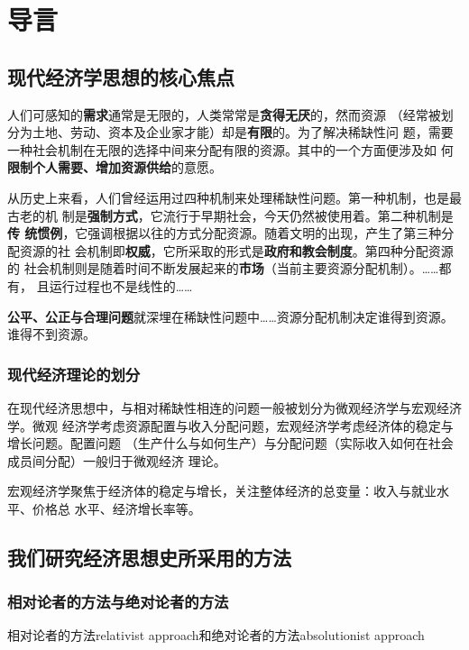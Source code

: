 \chapter{导言}

\section{现代经济学思想的核心焦点}

人们可感知的\textbf{需求}通常是无限的，人类常常是\textbf{贪得无厌}的，然而资源
（经常被划分为土地、劳动、资本及企业家才能）却是\textbf{有限}的。为了解决稀缺性问
题，需要一种社会机制在无限的选择中间来分配有限的资源。其中的一个方面便涉及如
何\textbf{限制个人需要、增加资源供给}的意愿。

从历史上来看，人们曾经运用过四种机制来处理稀缺性问题。第一种机制，也是最古老的机
制是\textbf{强制方式}，它流行于早期社会，今天仍然被使用着。第二种机制是\textbf{传
  统惯例}，它强调根据以往的方式分配资源。随着文明的出现，产生了第三种分配资源的社
会机制即\textbf{权威}，它所采取的形式是\textbf{政府和教会制度}。第四种分配资源的
社会机制则是随着时间不断发展起来的\textbf{市场}（当前主要资源分配机制）。……都有，
且运行过程也不是线性的……

\textbf{公平、公正与合理问题}就深埋在稀缺性问题中……资源分配机制决定谁得到资源。
谁得不到资源。

\subsection{现代经济理论的划分}

在现代经济思想中，与相对稀缺性相连的问题一般被划分为微观经济学与宏观经济学。微观
经济学考虑资源配置与收入分配问题，宏观经济学考虑经济体的稳定与增长问题。配置问题
（生产什么与如何生产）与分配问题（实际收入如何在社会成员间分配）一般归于微观经济
理论。

宏观经济学聚焦于经济体的稳定与增长，关注整体经济的总变量：收入与就业水平、价格总
水平、经济增长率等。

\section{我们研究经济思想史所采用的方法}

\subsection{相对论者的方法与绝对论者的方法}

相对论者的方法relativist approach和绝对论者的方法absolutionist approach

